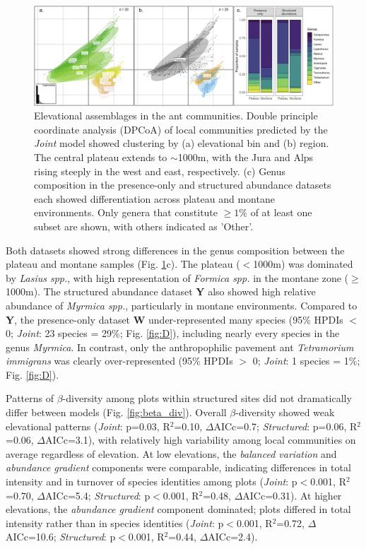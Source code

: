 \documentclass[preprint,final,times,12pt,3p]{elsarticle}
\begin{document}
\begin{figure}
	\centering\includegraphics[width=\textwidth]{../../../ms/1_Ecography/1/figs/DPCoA_assemblage.png}
	\caption{\label{fig:DPCoA_assemblages} Elevational assemblages in the ant communities. Double principle coordinate analysis (DPCoA) of local communities predicted by the \emph{Joint} model showed clustering by (a) elevational bin and (b) region. The central plateau extends to $\sim$1000m, with the Jura and Alps rising steeply in the west and east, respectively. (c) Genus composition in the presence-only and structured abundance datasets each showed differentiation across plateau and montane environments. Only genera that constitute $\geq 1\%$ of at least one subset are shown, with others indicated as 'Other'.}
\end{figure}

Both datasets showed strong differences in the genus composition between the plateau and montane samples (Fig. \ref{fig:DPCoA_assemblages}c). The plateau ($<$1000m) was dominated by \emph{Lasius spp.}, with high representation of \emph{Formica spp.} in the montane zone ($\geq$1000m). The structured abundance dataset \textbf{Y} also showed high relative abundance of \emph{Myrmica spp.}, particularly in montane environments. Compared to \textbf{Y}, the presence-only dataset \textbf{W} under-represented many species (95\% HPDIs $<$ 0; \emph{Joint}: 23 species = 29\%; Fig. \ref{fig:D}), including nearly every species in the genus \emph{Myrmica}. In contrast, only the anthropophilic pavement ant \emph{Tetramorium immigrans} was clearly over-represented (95\% HPDIs $>$ 0; \emph{Joint}: 1 species = 1\%; Fig. \ref{fig:D}). 

Patterns of $\beta$-diversity among plots within structured sites did not dramatically differ between models (Fig. \ref{fig:beta_div}). Overall $\beta$-diversity showed weak elevational patterns (\emph{Joint}: p=0.03, R$^2$=0.10, $\Delta$AICc=0.7; \emph{Structured}: p=0.06, R$^2$=0.06, $\Delta$AICc=3.1), with relatively high variability among local communities on average regardless of elevation. At low elevations, the \emph{balanced variation} and \emph{abundance gradient} components were comparable, indicating differences in total intensity and in turnover of species identities among plots (\emph{Joint}: p$<$0.001, R$^2$=0.70, $\Delta$AICc=5.4; \emph{Structured}: p$<$0.001, R$^2$=0.48, $\Delta$AICc=0.31). At higher elevations, the \emph{abundance gradient} component dominated; plots differed in total intensity rather than in species identities (\emph{Joint}: p$<$0.001, R$^2$=0.72, $\Delta$AICc=10.6; \emph{Structured}: p$<$0.001, R$^2$=0.44, $\Delta$AICc=2.4). 
\end{document}
